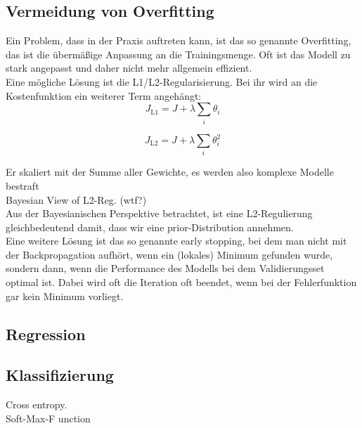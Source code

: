 \subsection{Vermeidung von Overfitting}
Ein Problem, dass in der Praxis auftreten kann, ist das so genannte Overfitting, das ist die übermäßige Anpassung an die Trainingsmenge. Oft ist das Modell zu stark angepasst und daher nicht mehr allgemein effizient.\\

Eine mögliche Lösung ist die L1/L2-Regularisierung. Bei ihr wird an die Kostenfunktion ein weiterer Term angehängt:\\

\begin{equation}
	J_{\text{L1}} = J + \lambda \sum_i \theta_i 
\end{equation}

\begin{equation}
	J_{\text{L2}} = J + \lambda \sum_i \theta_i^2
\end{equation}


Er skaliert mit der Summe aller Gewichte, es werden also komplexe Modelle bestraft 
\\Bayesian View of L2-Reg. (wtf?)\\

Aus der Bayesianischen Perspektive betrachtet, ist eine L2-Regulierung gleichbedeutend damit, dass wir eine prior-Distribution annehmen. \\
Eine weitere Lösung ist das so genannte early stopping, bei dem man nicht mit der Backpropagation aufhört, wenn ein (lokales) Minimum gefunden wurde, sondern dann, wenn die Performance des Modells bei dem Validierungsset optimal ist. Dabei wird oft die Iteration oft beendet, wenn bei der Fehlerfunktion gar kein Minimum vorliegt. 

\subsection{Regression}

\subsection{Klassifizierung}
Cross entropy.
\\
Soft-Max-F	unction
\\



